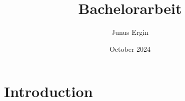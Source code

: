 \documentclass{article}
\title{Bachelorarbeit}
\author{Junus Ergin}
\date{October 2024}
\begin{document}
\maketitle

\section{Introduction}
\end{document}
